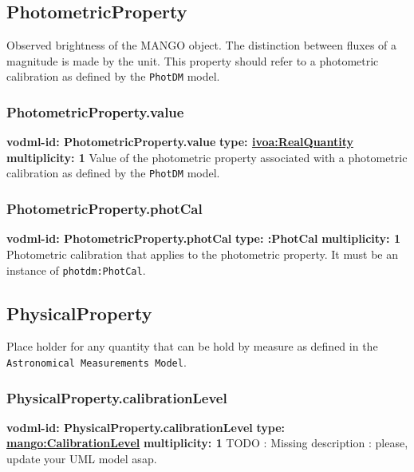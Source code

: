   \subsection{PhotometricProperty}
  \label{sect:PhotometricProperty}
    Observed brightness of the MANGO object. The distinction between fluxes of a magnitude is made by the unit. This property should refer to a photometric calibration as defined by the \texttt{PhotDM} model.

    \subsubsection{PhotometricProperty.value}
      \textbf{vodml-id: PhotometricProperty.value} \newline
      \textbf{type: \hyperref[sect:ivoa]{ivoa:RealQuantity}} \newline
      \textbf{multiplicity: 1} \newline 
      Value of the photometric property associated with a photometric calibration as defined by the \texttt{PhotDM} model.

    \subsubsection{PhotometricProperty.photCal}
      \textbf{vodml-id: PhotometricProperty.photCal} \newline
      \textbf{type: :PhotCal} \newline
      \textbf{multiplicity: 1} \newline 
      Photometric calibration that applies to the photometric property. It must be an instance of \texttt{photdm:PhotCal}.

  \subsection{PhysicalProperty}
  \label{sect:PhysicalProperty}
    Place holder for any quantity that can be hold by measure as defined in the \texttt{Astronomical Measurements Model}.

    \subsubsection{PhysicalProperty.calibrationLevel}
      \textbf{vodml-id: PhysicalProperty.calibrationLevel} \newline
      \textbf{type: \hyperref[sect:CalibrationLevel]{mango:CalibrationLevel}} \newline
      \textbf{multiplicity: 1} \newline 
      TODO : Missing description : please, update your UML model asap.


